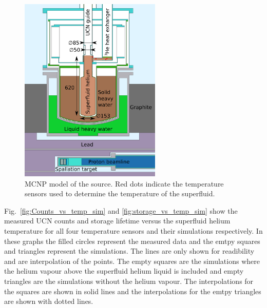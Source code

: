 \begin{figure}[h!]
  \centering
  \includegraphics[width=0.6\textwidth]{MCNPmodel.pdf}
  \caption{MCNP model of the source. Red dots indicate the temperature
    sensors used to determine the temperature of the superfluid.}
  \label{fig:mcnpmodel}
\end{figure}


Fig.~\ref{fig:Counts_vs_temp_sim} and \ref{fig:storage_vs_temp_sim}
show the measured UCN counts and storage lifetime versus the
superfluid helium temperature for all four temperature sensors and their
simulations respectively. In these graphs the filled circles represent
the measured data and the emtpy squares and triangles represent the
simulations. The lines are only shown for readibility and are
interpolation of the points. The empty squares are the simulations
where the helium vapour above the superfluid helium liquid is included
and empty triangles are the simulations without the helium vapour. The
interpolations for the squares are shown in solid lines and the
interpolations for the emtpy triangles are shown with dotted lines.

